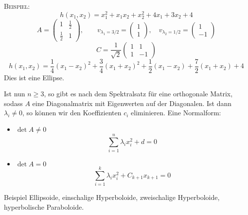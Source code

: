 		\textsc{Beispiel:}\\
		\[ h(x_1,x_2) = x_1^2 + x_1x_2 + x_2^2 + 4x_1 + 3x_2 + 4 \]
		\[
			A =
			\begin{pmatrix}
				1 & \tfrac{1}{2} \\ \tfrac{1}{2} & 1
			\end{pmatrix}
			,\qquad
			v_{\lambda_1 = 3/2} = 
			\begin{pmatrix}
				1 \\ 1
			\end{pmatrix}
			,\quad
			v_{\lambda_2 = 1/2} =
			\begin{pmatrix}
				1 \\ -1
			\end{pmatrix}
		\]
		\[
			C = \frac{1}{\sqrt{2}}
			\begin{pmatrix}
				1 & 1 \\ 1 & -1
			\end{pmatrix}
		\]
		\[ h(x_1,x_2) = \frac{1}{4}(x_1-x_2)^2 + \frac{3}{4}(x_1+x_2)^2 + \frac{1}{2}(x_1-x_2) + \frac{7}{2}(x_1+x_2) + 4 \]
		Dies ist eine Ellipse.


		Ist nun $n\geq 3$, so gibt es nach dem Spektralsatz für eine orthogonale Matrix, sodass $A$ eine Diagonalmatrix mit Eigenwerten auf der Diagonalen.
		Ist dann $\lambda_i\neq 0$, so können wir den Koeffizienten $c_i$ eliminieren.
		Eine Normalform:
		\begin{itemize}
			\item $\det A \neq 0$
				\[ \sum_{i=1}^n \lambda_ix_i^2 + d = 0 \]
			\item $\det A = 0$
				\[ \sum_{i=1}^k \lambda_ix_i^2 + C_{k+1}x_{k+1} = 0 \]
		\end{itemize}
		Beispiel Ellipsoide, einschalige Hyperboloide, zweischalige Hyperboloide, hyperbolische Paraboloide.


